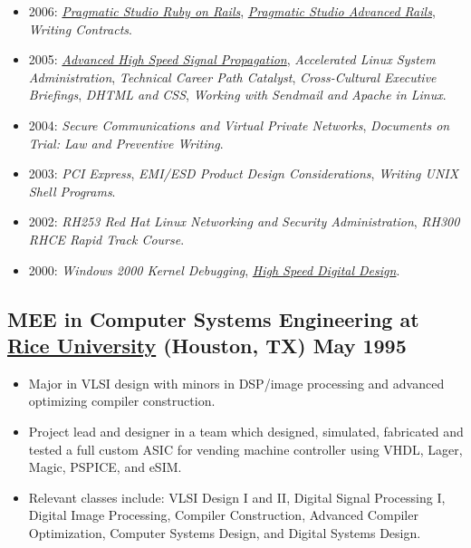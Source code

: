 \documentclass[10pt,letterpaper,oneside]{report}
\begin{document}
\begin{itemize}
  \item  2006: \href{http://pragmaticstudio.com/rails/}{\textit{Pragmatic Studio Ruby on Rails}},
    \href{http://pragmaticstudio.com/rails-ii}{\textit{Pragmatic Studio Advanced Rails}},
    \textit{Writing Contracts}.

  \item 2005: \href{http://www.sigcon.com/Pubs/HSSPsem.html}{\textit{Advanced High Speed Signal Propagation}},
    \textit{Accelerated Linux System Administration},
    \textit{Technical Career Path Catalyst},
    \textit{Cross-Cultural Executive Briefings},
    \textit{DHTML and CSS},
    \textit{Working with Sendmail and Apache in Linux}.

  \item 2004: \textit{Secure Communications and Virtual Private Networks},
    \textit{Documents on Trial: Law and Preventive Writing}.

  \item 2003: \textit{PCI Express},
    \textit{EMI/ESD Product Design Considerations},
    \textit{Writing UNIX Shell Programs}.

  \item 2002: \textit{RH253 Red Hat Linux Networking and Security Administration},
    \textit{RH300 RHCE Rapid Track Course}.

  \item 2000: \textit{Windows 2000 Kernel Debugging},
    \href{http://www.sigcon.com/Pubs/HSDDsem.htm}{\textit{High Speed Digital Design}}.
\end{itemize}

\medskip

\begin{minipage}{\textwidth}
  \subsection[MEE in Computer Systems Engineering]{
    MEE in Computer Systems Engineering at \href{http://www.ece.rice.edu/}{Rice University}
    {\small (Houston, TX)}
    \hfill
    May 1995
  }

  \begin{itemize}
    \item Major in VLSI design with minors in DSP/image processing and advanced optimizing compiler construction.

    \item Project lead and designer in a team which designed, simulated, fabricated and tested a full custom ASIC for vending machine controller using VHDL, Lager, Magic, PSPICE, and eSIM.

    \item Relevant classes include: VLSI Design I and II, Digital Signal Processing I, Digital Image Processing, Compiler Construction, Advanced Compiler Optimization, Computer Systems Design, and Digital Systems Design.
  \end{itemize}
\end{minipage}
\end{document}
